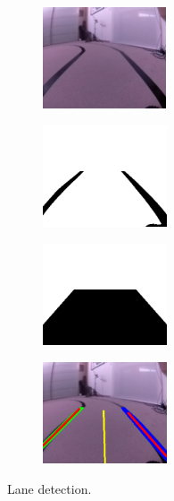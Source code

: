 \documentclass[conference]{IEEEtran}
\begin{document}
\begin{figure}[t]
	\centering
	\begin{subfigure}[c]{0.24\textwidth}
		\centerline{\includegraphics[height=3cm]{media/lane_frame}}
		\label{sub:lane}
	\end{subfigure}
	\begin{subfigure}[c]{0.24\textwidth}
		\centerline{\includegraphics[height=3cm]{media/roi_frame}}
		\label{sub:roi}
	\end{subfigure}
	\begin{subfigure}[c]{0.24\textwidth}
		\centerline{\includegraphics[height=3cm]{media/stencil}}
		\label{sub:stencil}
	\end{subfigure}
	\begin{subfigure}[c]{0.24\textwidth}
		\centerline{\includegraphics[height=3cm]{media/frame}}
		\label{sub:frame}
	\end{subfigure}
	\caption{Lane detection.}
	\label{fig:lanedet}
\end{figure}
\end{document}
